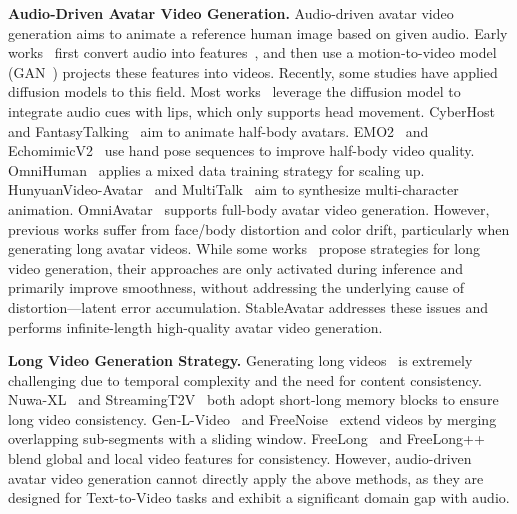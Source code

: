 \noindent\textbf{Audio-Driven Avatar Video Generation.}
Audio-driven avatar video generation aims to animate a reference human image based on given audio.
Early works~\cite{guan2023stylesync, zhang2023sadtalker, cheng2022videoretalking, pang2023dpe, yin2022styleheat, gong2023toontalker, wang2024v_express} first convert audio into features~\cite{tran2018nonlinear, song2022audio}, and then use a motion-to-video model (GAN~\cite{goodfellow2020generative}) projects these features into videos. 
Recently, some studies have applied diffusion models to this field. Most works~\cite{tian2024emo, wei2024aniportrait, ji2025sonic, chen2025echomimic, li2024latentsync, jiang2024loopy} leverage the diffusion model to integrate audio cues with lips, which only supports head movement. 
CyberHost~\cite{lin2025cyberhost} and FantasyTalking~\cite{wang2025fantasytalking} aim to animate half-body avatars. 
EMO2~\cite{tian2025emo2} and EchomimicV2~\cite{meng2025echomimicv2} use hand pose sequences to improve half-body video quality. 
OmniHuman~\cite{lin2025omnihuman} applies a mixed data training strategy for scaling up.
HunyuanVideo-Avatar~\cite{chen2025hunyuanvideo} and MultiTalk~\cite{kong2025let} aim to synthesize multi-character animation. OmniAvatar~\cite{gan2025omniavatar} supports full-body avatar video generation.
However, previous works suffer from face/body distortion and color drift, particularly when generating long avatar videos. While some works~\cite{cui2025hallo3, ji2025sonic, kong2025let, gan2025omniavatar, xu2024hallo} propose strategies for long video generation, their approaches are only activated during inference and primarily improve smoothness, without addressing the underlying cause of distortion—latent error accumulation.
StableAvatar addresses these issues and performs infinite-length high-quality avatar video generation.

\noindent\textbf{Long Video Generation Strategy.}
Generating long videos~\cite{skorokhodov2022stylegan, brooks2022generating, harvey2022flexible, voleti2022mcvd, tseng2023consistent, yin2023nuwa, lu2024freelong, lu2025freelong++} is extremely challenging due to temporal complexity and the need for content consistency. 
Nuwa-XL~\cite{yin2023nuwa} and StreamingT2V~\cite{henschel2025streamingt2v} both adopt short-long memory blocks to ensure long video consistency. Gen-L-Video~\cite{wang2023gen} and FreeNoise~\cite{qiu2023freenoise} extend videos by merging overlapping sub-segments with a sliding window. FreeLong~\cite{lu2024freelong} and FreeLong++~\cite{lu2025freelong++} blend global and local video features for consistency.
However, audio-driven avatar video generation cannot directly apply the above methods, as they are designed for Text-to-Video tasks and exhibit a significant domain gap with audio.